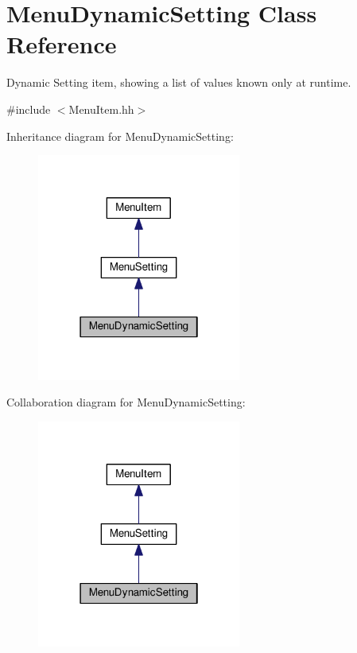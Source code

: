 \hypertarget{classMenuDynamicSetting}{}\section{Menu\+Dynamic\+Setting Class Reference}
\label{classMenuDynamicSetting}


Dynamic Setting item, showing a list of values known only at runtime.  




{\ttfamily \#include $<$Menu\+Item.\+hh$>$}



Inheritance diagram for Menu\+Dynamic\+Setting\+:\nopagebreak
\begin{figure}[H]
\begin{center}
\leavevmode
\includegraphics[width=190pt]{classMenuDynamicSetting__inherit__graph}
\end{center}
\end{figure}


Collaboration diagram for Menu\+Dynamic\+Setting\+:\nopagebreak
\begin{figure}[H]
\begin{center}
\leavevmode
\includegraphics[width=190pt]{classMenuDynamicSetting__coll__graph}
\end{center}
\end{figure}
